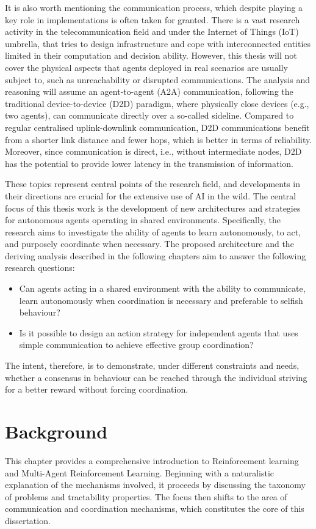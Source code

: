 \documentclass[a4paper,singleside,12pt]{report} %
\begin{document}
It is also worth mentioning the communication process, which despite playing a key role in implementations is often taken for granted. There is a vast research activity in the telecommunication field and under the Internet of Things (IoT) umbrella, that tries to design infrastructure and cope with interconnected entities limited in their computation and decision ability. However, this thesis will not cover the physical aspects that agents deployed in real scenarios are usually subject to, such as unreachability or disrupted communications. The analysis and reasoning will assume an agent-to-agent (A2A) communication, following the traditional device-to-device (D2D) paradigm, where physically close devices (e.g., two agents), can communicate directly over a so-called sideline. Compared to regular centralised uplink-downlink communication, D2D communications benefit from a shorter link distance and fewer hops, which is better in terms of reliability. Moreover, since communication is direct, i.e., without intermediate nodes, D2D has the potential to provide lower latency in the transmission of information.

These topics represent central points of the research field, and developments in their directions are crucial for the extensive use of AI in the wild. The central focus of this thesis work is the development of new architectures and strategies for autonomous agents operating in shared environments. Specifically, the research aims to investigate the ability of agents to learn autonomously, to act, and purposely coordinate when necessary. The proposed architecture and the deriving analysis described in the following chapters aim to answer the following research questions:

\begin{itemize}
\item Can agents acting in a shared environment with the ability to communicate, learn autonomously when coordination is necessary and preferable to selfish behaviour?
\item Is it possible to design an action strategy for independent agents that uses simple communication to achieve effective group coordination?
\end{itemize}

The intent, therefore, is to demonstrate, under different constraints and needs, whether a consensus in behaviour can be reached through the individual striving for a better reward without forcing coordination.


\chapter{Background}\label{background}
This chapter provides a comprehensive introduction to Reinforcement learning and Multi-Agent Reinforcement Learning. Beginning with a naturalistic explanation of the mechanisms involved, it proceeds by discussing the taxonomy of problems and tractability properties. The focus then shifts to the area of communication and coordination mechanisms, which constitutes the core of this dissertation.
\end{document}
